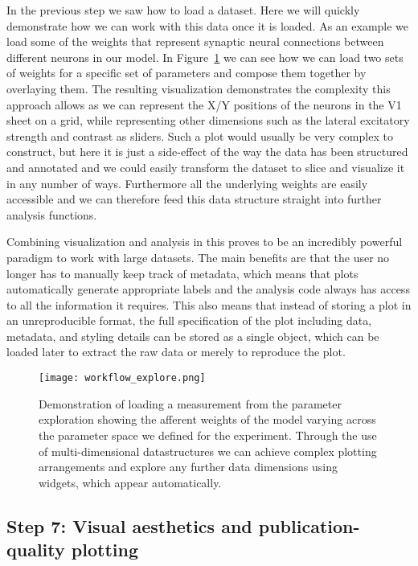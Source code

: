 In the previous step we saw how to load a dataset.  Here we will
quickly demonstrate how we can work with this data once it is loaded.
As an example we load some of the weights that represent synaptic
neural connections between different neurons in our model. In
Figure~\ref{workflow_explore} we can see how we can load two sets of
weights for a specific set of parameters and compose them together by
overlaying them. The resulting visualization demonstrates the
complexity this approach allows as we can represent the X/Y positions
of the neurons in the V1 sheet on a grid, while representing other
dimensions such as the lateral excitatory strength and contrast as
sliders. Such a plot would usually be very complex to construct, but
here it is just a side-effect of the way the data has been structured
and annotated and we could easily transform the dataset to slice and
visualize it in any number of ways. Furthermore all the underlying
weights are easily accessible and we can therefore feed this data
structure straight into further analysis functions.

Combining visualization and analysis in this proves to be an
incredibly powerful paradigm to work with large datasets. The main
benefits are that the user no longer has to manually keep track of
metadata, which means that plots automatically generate appropriate
labels and the analysis code always has access to all the information
it requires. This also means that instead of storing a plot in an
unreproducible format, the full specification of the plot including
data, metadata, and styling details can be stored as a single object,
which can be loaded later to extract the raw data or merely to
reproduce the plot.

\begin{figure}
	\centering
        \texttt{[image: workflow\_explore.png]}
	\caption[Demonstration of complex parameter exploration in
      HoloViews.]{Demonstration of loading a measurement from the
      parameter exploration showing the afferent weights of the model
      varying across the parameter space we defined for the
      experiment. Through the use of multi-dimensional datastructures
      we can achieve complex plotting arrangements and explore any
      further data dimensions using widgets, which appear
      automatically.}
	\label{workflow_explore}
\end{figure}

\subsection{Step 7: Visual aesthetics and publication-quality plotting}


